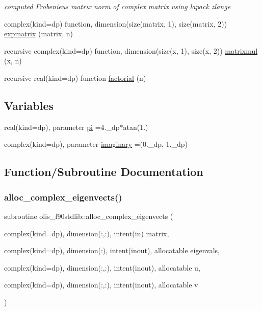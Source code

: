 \begin{DoxyCompactItemize}
\begin{DoxyCompactList}\small\item\em computed Frobenieus matrix norm of complex matrix using lapack zlange \end{DoxyCompactList}\item 
complex(kind=dp) function, dimension(size(matrix, 1), size(matrix, 2)) \hyperlink{namespaceolis__f90stdlib_a309c2107f5d5071bb8c1bad4362f88e1}{expmatrix} (matrix, n)
\item 
recursive complex(kind=dp) function, dimension(size(x, 1), size(x, 2)) \hyperlink{namespaceolis__f90stdlib_af70533a90b595522cd1bf47b37a2319d}{matrixmul} (x, n)
\item 
recursive real(kind=dp) function \hyperlink{namespaceolis__f90stdlib_ad0e4f304a609e1d8c088778344f1aa67}{factorial} (n)
\end{DoxyCompactItemize}
\subsection*{Variables}
\begin{DoxyCompactItemize}
\item 
real(kind=dp), parameter \hyperlink{namespaceolis__f90stdlib_a106e09303fbf05972f0635ff67f73c9d}{pi} =4.\+\_\+dp$\ast$atan(1.)
\item 
complex(kind=dp), parameter \hyperlink{namespaceolis__f90stdlib_a0a22d30625256a14acc49cd749e88cb7}{imaginary} =(0.\+\_\+dp, 1.\+\_\+dp)
\end{DoxyCompactItemize}


\subsection{Function/\+Subroutine Documentation}
\mbox{\label{namespaceolis__f90stdlib_af0119bd404337367bc0727decf6dd89c}} 
\subsubsection{\texorpdfstring{alloc\+\_\+complex\+\_\+eigenvects()}{alloc\_complex\_eigenvects()}}
{\footnotesize\ttfamily subroutine olis\+\_\+f90stdlib\+::alloc\+\_\+complex\+\_\+eigenvects (\begin{DoxyParamCaption}\item[{complex(kind=dp), dimension(\+:,\+:), intent(in)}]{matrix,  }\item[{complex(kind=dp), dimension(\+:), intent(inout), allocatable}]{eigenvals,  }\item[{complex(kind=dp), dimension(\+:,\+:), intent(inout), allocatable}]{u,  }\item[{complex(kind=dp), dimension(\+:,\+:), intent(inout), allocatable}]{v }\end{DoxyParamCaption})}



